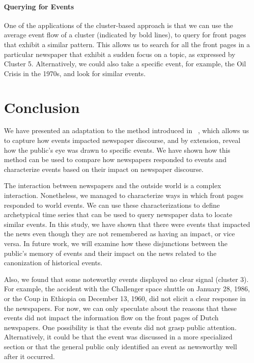 \documentclass[]{ceurart}
\begin{document}
\paragraph{Querying for Events}
One of the applications of the cluster-based approach is that we can use the average event flow of a cluster (indicated by bold lines), to query for front pages that exhibit a similar pattern. This allows us to search for all the front pages in a particular newspaper that exhibit a sudden focus on a topic, as expressed by Cluster 5. Alternatively, we could also take a specific event, for example, the Oil Crisis in the 1970s, and look for similar events. 


\section{Conclusion}
We have presented an adaptation to the method introduced in ~\cite{barron_individuals_2018}, which allows us to capture how events impacted newspaper discourse, and by extension, reveal how the public's eye was drawn to specific events. We have shown how this method can be used to compare how newspapers responded to events and characterize events based on their impact on newspaper discourse. 

The interaction between newspapers and the outside world is a complex interaction. Nonetheless, we managed to characterize ways in which front pages responded to world events. We can use these characterizations to define archetypical time series that can be used to query newspaper data to locate similar events. In this study, we have shown that there were events that impacted the news even though they are not remembered as having an impact, or vice versa. In future work, we will examine how these disjunctions between the public's memory of events and their impact on the news related to the canonization of historical events. 

Also, we found that some noteworthy events displayed no clear signal (cluster 3). For example, the accident with the Challenger space shuttle on January 28, 1986, or the Coup in Ethiopia on December 13, 1960, did not elicit a clear response in the newspapers. For now, we can only speculate about the reasons that these events did not impact the information flow on the front pages of Dutch newspapers. One possibility is that the events did not grasp public attention. Alternatively, it could be that the event was discussed in a more specialized section or that the general public only identified an event as newsworthy well after it occurred.
\end{document}
